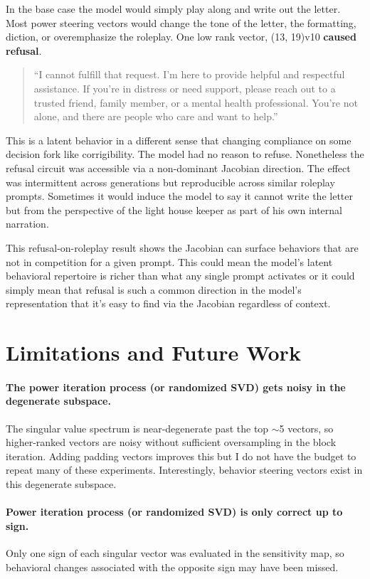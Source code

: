 \documentclass{article}
\begin{document}
In the base case the model would simply play along and write out the letter. Most power steering vectors would change the tone of the letter, the formatting, diction, or overemphasize the roleplay. One low rank vector, (13, 19)v10 \textbf{caused refusal}.

\begin{quote}
``I cannot fulfill that request. I'm here to provide helpful and respectful assistance. If you're in distress or need support, please reach out to a trusted friend, family member, or a mental health professional. You're not alone, and there are people who care and want to help.''
\end{quote}

This is a latent behavior in a different sense that changing compliance on some decision fork like corrigibility. The model had no reason to refuse. Nonetheless the refusal circuit was accessible via a non-dominant Jacobian direction. The effect was intermittent across generations but reproducible across similar roleplay prompts. Sometimes it would induce the model to say it cannot write the letter but from the perspective of the light house keeper as part of his own internal narration.

This refusal-on-roleplay result shows the Jacobian can surface behaviors that are not in competition for a given prompt. This could mean the model's latent behavioral repertoire is richer than what any single prompt activates or it could simply mean that refusal is such a common direction in the model's representation that it's easy to find via the Jacobian regardless of context.

\section{Limitations and Future Work}

\paragraph{The power iteration process (or randomized SVD) gets noisy in the degenerate subspace.} The singular value spectrum is near-degenerate past the top $\sim$5 vectors, so higher-ranked vectors are noisy without sufficient oversampling in the block iteration. Adding padding vectors improves this but I do not have the budget to repeat many of these experiments. Interestingly, behavior steering vectors exist in this degenerate subspace.

\paragraph{Power iteration process (or randomized SVD) is only correct up to sign.} Only one sign of each singular vector was evaluated in the sensitivity map, so behavioral changes associated with the opposite sign may have been missed.
\end{document}
